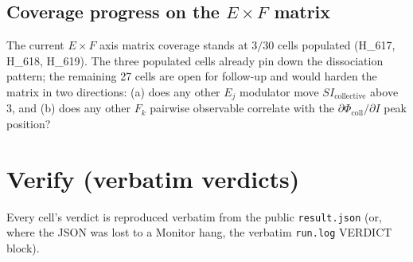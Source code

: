 \documentclass[11pt,a4paper]{article}
\begin{document}
\subsection{Coverage progress on the $E \times F$ matrix}

The current $E \times F$ axis matrix coverage stands at $3/30$ cells
populated (H\_617, H\_618, H\_619). The three populated cells
already pin down the dissociation pattern; the remaining 27 cells
are open for follow-up and would harden the matrix in two
directions: (a) does any other $E_j$ modulator move
$SI_{\mathrm{collective}}$ above 3, and (b) does any other
$F_k$ pairwise observable correlate with the
$\partial\Phi_{\mathrm{coll}}/\partial I$ peak position?

\section{Verify (verbatim verdicts)}
\label{sec:verify}

Every cell's verdict is reproduced verbatim from the public
\texttt{result.json} (or, where the JSON was lost to a Monitor hang,
the verbatim \texttt{run.log} VERDICT block).
\end{document}

